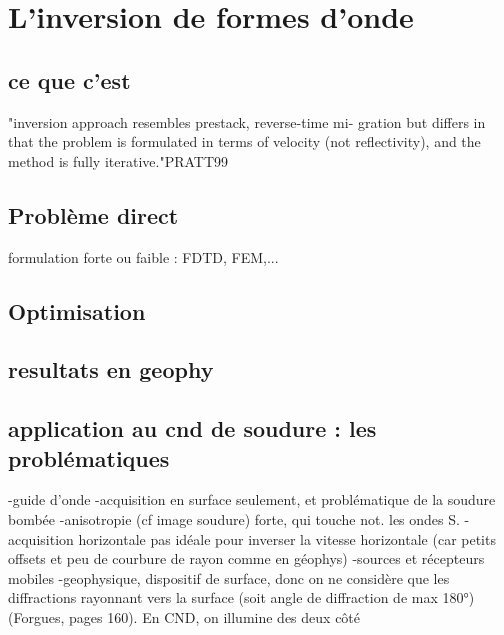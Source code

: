 \chapter{L'inversion de formes d'onde}

\section{ce que c'est}
"inversion approach resembles prestack, reverse-time mi-
gration but differs in that the problem is formulated in
terms of velocity (not reflectivity), and the method is
fully iterative."PRATT99



\section{Problème direct}
formulation forte ou faible : 
FDTD, FEM,...

\section{Optimisation}


\section{resultats en geophy}

\section{application au cnd de soudure : les problématiques}

-guide d'onde
-acquisition en surface seulement, et problématique de la soudure bombée
-anisotropie (cf image soudure) forte, qui touche not. les ondes S.
-acquisition horizontale pas idéale pour inverser la vitesse horizontale (car petits offsets et peu de courbure de rayon comme en géophys)
-sources et récepteurs mobiles 
-geophysique, dispositif de surface, donc on ne considère que les diffractions rayonnant vers la surface (soit angle de diffraction de max 180°)(Forgues, pages 160). En CND, on illumine des deux côté


